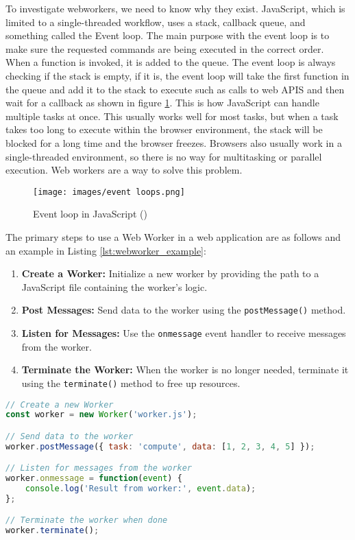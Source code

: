 To investigate webworkers, we need to know why they exist. JavaScript, which is limited to a single-threaded workflow, uses a stack, callback queue, and something called the Event loop. The main purpose with the event loop is to make sure the requested commands are being executed in the correct order. When a function is invoked, it is added to the queue. The event loop is always checking if the stack is empty, if it is, the event loop will take the first function in the queue and add it to the stack to execute such as calls to web APIS and then wait for a callback as shown in figure \ref{fig:event loop}. This is how JavaScript can handle multiple tasks at once. This usually works well for most tasks, but when a task takes too long to execute within the browser environment, the stack will be blocked for a long time and the browser freezes. Browsers also usually work in a single-threaded environment, so there is no way for multitasking or parallel execution. Web workers are a way to solve this problem.

\begin{figure}[H]
    \centering
    \texttt{[image: images/event loops.png]}
    \caption{Event loop in JavaScript (\cite{djarv2020performance})}
    \label{fig:event loop}
\end{figure}

The primary steps to use a Web Worker in a web application are as follows and an example in Listing \ref{lst:webworker_example}:

\begin{enumerate}
    \item \textbf{Create a Worker:} Initialize a new worker by providing the path to a JavaScript file containing the worker's logic.
    \item \textbf{Post Messages:} Send data to the worker using the \texttt{postMessage()} method.
    \item \textbf{Listen for Messages:} Use the \texttt{onmessage} event handler to receive messages from the worker.
    \item \textbf{Terminate the Worker:} When the worker is no longer needed, terminate it using the \texttt{terminate()} method to free up resources.
\end{enumerate}
\begin{lstlisting}[language=JavaScript, caption=Main thread script, label=lst:webworker_example]
// Create a new Worker
const worker = new Worker('worker.js');

// Send data to the worker
worker.postMessage({ task: 'compute', data: [1, 2, 3, 4, 5] });

// Listen for messages from the worker
worker.onmessage = function(event) {
    console.log('Result from worker:', event.data);
};

// Terminate the worker when done
worker.terminate();
\end{lstlisting}

